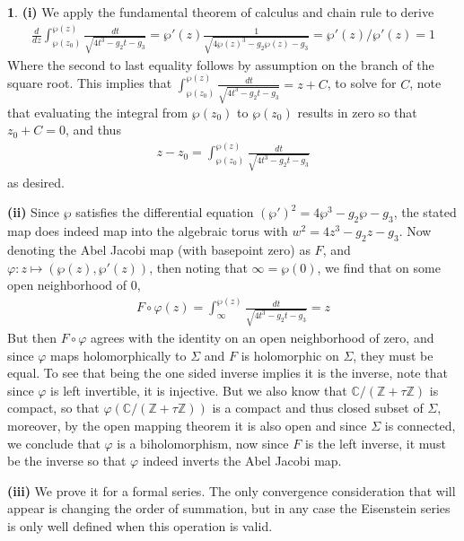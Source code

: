 \documentclass[10.5pt]{article}
\theoremstyle{definition}
\newtheorem{pb}{}
\begin{document}
    \begin{pb}
        \textbf{(i)} We apply the fundamental theorem of calculus and chain rule to derive
        \begin{align}
            \frac{d}{dz}\int_{\wp(z_0)}^{\wp(z)} \frac{dt}{\sqrt{4t^3-g_2t-g_3}} = \wp'(z)\frac{1}{\sqrt{4\wp(z)^3 - g_2\wp(z) - g_3}} = \wp'(z)/\wp'(z) = 1
        \end{align}
        Where the second to last equality follows by assumption on the branch of the square root. This implies that \(\int_{\wp(z_0)}^{\wp(z)} \frac{dt}{\sqrt{4t^3-g_2t-g_3}} = z + C\), to solve for \(C\), note that evaluating the integral from \(\wp(z_0)\) to \(\wp(z_0)\) results in zero so that \(z_0 + C = 0\), and thus
        \begin{align}
            z-z_0 = \int_{\wp(z_0)}^{\wp(z)} \frac{dt}{\sqrt{4t^3-g_2t-g_3}}
        \end{align}
        as desired.

        \textbf{(ii)} Since \(\wp\) satisfies the differential equation \((\wp')^2 = 4\wp^3- g_2\wp - g_3\), the stated map does indeed map into the algebraic torus with \(w^2 = 4z^3 - g_2z - g_3\). Now denoting the Abel Jacobi map (with basepoint zero) as \(F\), and \(\varphi: z \mapsto (\wp(z),\wp'(z))\), then noting that \(\infty = \wp(0)\), we find that on some open neighborhood of \(0\),
        \begin{align*}
            F\circ \varphi(z) = \int_{\infty}^{\wp(z)} \frac{dt}{\sqrt{4t^3-g_2t-g_3}} = z
        \end{align*}
        But then \(F\circ \varphi\) agrees with the identity on an open neighborhood of zero, and since \(\varphi\) maps holomorphically to \(\Sigma\) and \(F\) is holomorphic on \(\Sigma\), they must be equal. To see that being the one sided inverse implies it is the inverse, note that since \(\varphi\) is left invertible, it is injective. But we also know that \(\mathbb{C}/(\mathbb{Z} + \tau \mathbb{Z})\) is compact, so that \(\varphi(\mathbb{C}/(\mathbb{Z} + \tau \mathbb{Z}))\) is a compact and thus closed subset of \(\Sigma\), moreover, by the open mapping theorem it is also open and since \(\Sigma\) is connected, we conclude that \(\varphi\) is a biholomorphism, now since \(F\) is the left inverse, it must be the inverse so that \(\varphi\) indeed inverts the Abel Jacobi map.

        \textbf{(iii)} We prove it for a formal series. The only convergence consideration that will appear is changing the order of summation, but in any case the Eisenstein series is only well defined when this operation is valid.


\end{pb}
\end{document}
